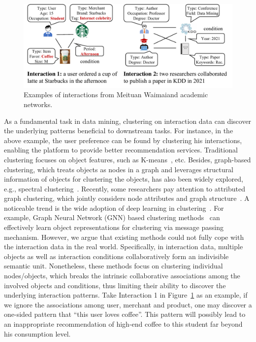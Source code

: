 \documentclass[11pt]{article}
\begin{document}
\begin{figure}%
	\centering
	\includegraphics[width=0.70\linewidth]{submissions/HyCLID/figures/example.pdf}
	\caption{Examples of interactions from Meituan Waimai\protect\footnotemark[2] and academic networks. }
	\label{fig:example}
\end{figure}

As a fundamental task in data mining, clustering on interaction data can discover the underlying patterns beneficial to downstream tasks. For instance, in the above example, the user preference can be found by clustering his interactions, enabling the platform to provide better recommendation services. Traditional clustering focuses on object features, such as K-means~\cite{hartigan_algorithm_1979,zhang_maximum_2021}, etc. Besides, graph-based clustering, which treats objects as nodes in a graph and leverages structural information of objects for clustering the objects, has also been widely explored, e.g., spectral clustering~\cite{ng2001spectral}. Recently, some researchers pay attention to attributed graph clustering, which jointly considers node attributes and graph structure~\cite{yang_effective_2021}. A noticeable trend is the wide adoption of deep learning in clustering~\cite{min_survey_2018}. For example, Graph Neural Network (GNN) based clustering methods~\cite{bo_structural_2020,wang_attributed_2019,song_deep_2021,yang_variational_2021} can effectively learn object representations for clustering via message passing mechanism. However, we argue that existing methods could not fully cope with the interaction data in the real world. Specifically, in interaction data, multiple objects as well as interaction conditions collaboratively form an indivisible semantic unit. Nonetheless, these methods focus on clustering individual nodes/objects, which breaks the intrinsic collaborative associations among the involved objects and conditions, thus limiting their ability to discover the underlying interaction patterns. Take Interaction 1 in Figure~\ref{fig:example} as an example, if we ignore the associations among user, merchant and product, one may discover a one-sided pattern that ``this user loves coffee''. This pattern will possibly lead to an inappropriate recommendation of high-end coffee to this student far beyond his consumption level.
\end{document}

